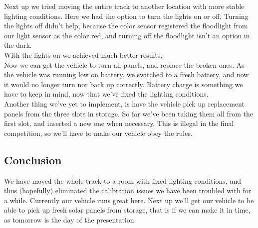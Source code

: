 Next up we tried moving the entire track to another location with more
stable lighting conditions. Here we had the option to turn the lights on
or off. Turning the lights off didn't help, because the color sensor
registered the floodlight from our light sensor as the color red, and
turning off the floodlight isn't an option in the dark.\\With the lights
on we achieved much better results.\\Now we can get the vehicle to turn
all panels, and replace the broken ones. As the vehicle was running low
on battery, we switched to a fresh battery, and now it would no longer
turn nor back up correctly. Battery charge is something we have to keep
in mind, now that we've fixed the lighting conditions.\\Another thing
we've yet to implement, is have the vehicle pick up replacement panels
from the three slots in storage. So far we've been taking them all from
the first slot, and inserted a new one when necessary. This is illegal
in the final competition, so we'll have to make our vehicle obey the
rules.

\subsection{Conclusion}

We have moved the whole track to a room with fixed lighting conditions,
and thus (hopefully) eliminated the calibration issues we have been
troubled with for a while. Currently our vehicle runs great here. Next
up we'll get our vehicle to be able to pick up fresh solar panels from
storage, that is if we can make it in time, as tomorrow is the day of
the presentation.
